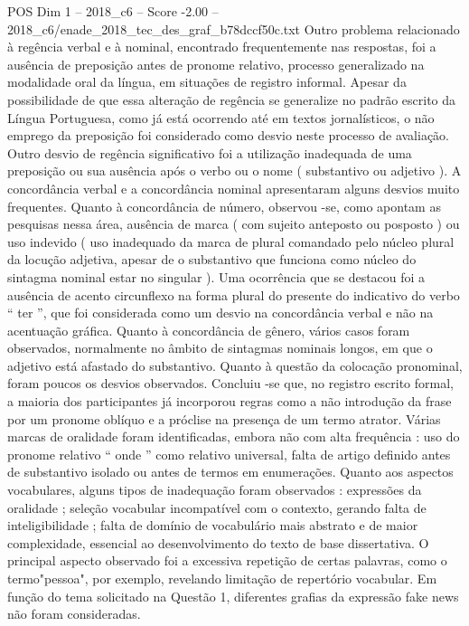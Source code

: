 \begin{textsample}{POS Dim 1 – 2018\_c6 – Score -2.00 – 2018\_c6/enade\_2018\_tec\_des\_graf\_b78dccf50c.txt}
Outro problema relacionado à regência verbal e à nominal, encontrado frequentemente nas respostas, foi a ausência de preposição antes de pronome relativo, processo generalizado na modalidade oral da língua, em situações de registro informal.
Apesar da possibilidade de que essa alteração de regência se generalize no padrão escrito da Língua Portuguesa, como já está ocorrendo até em textos jornalísticos, o não emprego da preposição foi considerado como desvio neste processo de avaliação.
Outro desvio de regência significativo foi a utilização inadequada de uma preposição ou sua ausência após o verbo ou o nome ( substantivo ou adjetivo ).
A concordância verbal e a concordância nominal apresentaram alguns desvios muito frequentes.
Quanto à concordância de número, observou -se, como apontam as pesquisas nessa área, ausência de marca ( com sujeito anteposto ou posposto ) ou uso indevido ( uso inadequado da marca de plural comandado pelo núcleo plural da locução adjetiva, apesar de o substantivo que funciona como núcleo do sintagma nominal estar no singular ).
Uma ocorrência que se destacou foi a ausência de acento circunflexo na forma plural do presente do indicativo do verbo “ ter ”, que foi considerada como um desvio na concordância verbal e não na acentuação gráfica.
Quanto à concordância de gênero, vários casos foram observados, normalmente no âmbito de sintagmas nominais longos, em que o adjetivo está afastado do substantivo.
Quanto à questão da colocação pronominal, foram poucos os desvios observados.
Concluiu -se que, no registro escrito formal, a maioria dos participantes já incorporou regras como a não introdução da frase por um pronome oblíquo e a próclise na presença de um termo atrator.
Várias marcas de oralidade foram identificadas, embora não com alta frequência : uso do pronome relativo “ onde ” como relativo universal, falta de artigo definido antes de substantivo isolado ou antes de termos em enumerações.
Quanto aos aspectos vocabulares, alguns tipos de inadequação foram observados : expressões da oralidade ; seleção vocabular incompatível com o contexto, gerando falta de inteligibilidade ; falta de domínio de vocabulário mais abstrato e de maior complexidade, essencial ao desenvolvimento do texto de base dissertativa.
O principal aspecto observado foi a excessiva repetição de certas palavras, como o termo"pessoa", por exemplo, revelando limitação de repertório vocabular.
Em função do tema solicitado na Questão 1, diferentes grafias da expressão fake news não foram consideradas.

\end{textsample}
